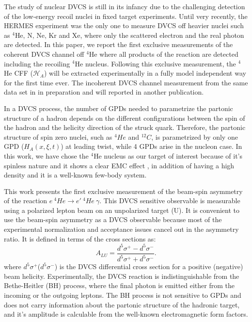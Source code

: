 \documentclass[nofootinbib,twocolumn,showpacs,prl,superscriptaddress,secnumarabic,amssymb,nobibnotes,aps,floatfix]{revtex4}
\begin{document}
The study of nuclear DVCS is still in its infancy due to the challenging 
detection of the low-energy recoil nuclei in fixed target experiments. Until 
very recently, the HERMES experiment \cite{Ellinghaus:2002zw} was the only one 
to measure DVCS off heavier nuclei such as $^4$He, N, Ne, Kr and Xe, where only 
the scattered electron and the real photon are detected. In this paper, we 
report the first exclusive measurements of the coherent DVCS channel off $^4$He 
where all products of the reaction are detected including the recoiling $^4$He 
nucleus. Following this exclusive measurement, the $^4$He CFF 
($\mathcal{H}_{A}$) will be extracted experimentally in a fully model 
independent way for the first time ever. The incoherent DVCS channel 
measurement from the same data set in in preparation and will reported in 
another publication. 

In a DVCS process, the number of GPDs needed to 
parametrize the partonic structure of a hadron depends on the different 
configurations between the spin of the hadron and the helicity direction of the 
struck quark.  Therefore, the partonic structure of spin zero nuclei, such as 
$^4He$ and $^{12}C$, is parametrized by only one GPD ($H_{A}(x,\xi,t)$) at 
leading twist, while 4 GPDs arise in the nucleon case.  In this work, we have 
chose the $^4$He nucleus as our target of interest because of it's spinless 
nature and it shows a clear EMC effect \cite{JSeely}, in addition of having a 
high density and it is a well-known few-body system.

This work presents the first exclusive measurement of the beam-spin asymmetry 
of the reaction $e~^{4}He\rightarrow e'~^{4}He~\gamma$. This DVCS sensitive 
observable is measurable using a polarized lepton beam on an unpolarized target 
(U). It is convenient to use the beam-spin asymmetry as a DVCS observable 
because most of the experimental normalization and acceptance issues cancel out 
in the asymmetry ratio. It is defined in terms of the cross sections as:
  \begin{equation}
  A_{LU} = \frac{d^{5}\sigma^{+} - d^{5}\sigma^{-} }
                {d^{5}\sigma^{+} + d^{5}\sigma^{-}}.
    \label{BSA_equation}
  \end{equation}
where $d^{5}\sigma^{+}$($d^{5}\sigma^{-}$) is the DVCS differential cross 
section for a positive (negative) beam helicity. Experimentally, the DVCS 
reaction is indistinguishable from the Bethe-Heitler (BH) process, where the 
final photon is emitted either from the incoming or the outgoing leptons. The 
BH process is not sensitive to GPDs and does not carry information about the 
partonic structure of the hadronic target, and it's amplitude is calculable 
from the well-known electromagnetic form factors.
\end{document}
